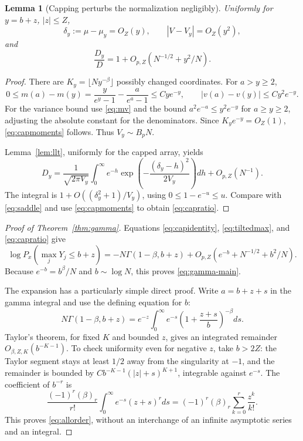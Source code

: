 \documentclass[11pt,a4paper]{article}
\numberwithin{equation}{section}
\newtheorem{lemma}[theorem]{Lemma}
\theoremstyle{definition}
\theoremstyle{remark}
\newcommand{\rise}[2]{(#1)_{#2}}
\begin{document}
\begin{lemma}[Capping perturbs the normalization negligibly]
\label{lem:capping}
Uniformly for $y=b+z$, $|z|\le Z$,
\begin{equation}
 \delta_y:=\mu-\mu_y=O_Z(y),\qquad
 |V-V_y|=O_Z(y^2), \label{eq:capmoments}
\end{equation}
and
\begin{equation}
 \frac{D_y}{D}=1+O_{p,Z}(N^{-1/2}+y^2/N). \label{eq:capratio}
\end{equation}
\end{lemma}
\begin{proof}
There are $K_y=\lfloor Ny^{-\beta}\rfloor$ possibly changed
coordinates. For $a>y\ge2$,
\[
 0\le m(a)-m(y)
 =\frac{y}{e^y-1}-\frac{a}{e^a-1}\le Cye^{-y},
 \qquad |v(a)-v(y)|\le Cy^2e^{-y}.
\]
For the variance bound use \eqref{eq:mv} and the bound
$a^2e^{-a}\le y^2e^{-y}$ for $a\ge y\ge2$, adjusting the absolute
constant for the denominators. Since $K_ye^{-y}=O_Z(1)$,
\eqref{eq:capmoments} follows. Thus $V_y\sim B_pN$.

Lemma~\ref{lem:llt}, uniformly for the capped array, yields
\[
 D_y=\frac1{\sqrt{2\pi V_y}}
 \int_0^\infty e^{-h}
       \exp\!\left(-\frac{(\delta_y-h)^2}{2V_y}\right)dh
       +O_{p,Z}(N^{-1}).
\]
The integral is $1+O((\delta_y^2+1)/V_y)$, using
$0\le1-e^{-u}\le u$. Compare with
\eqref{eq:saddle} and use \eqref{eq:capmoments} to obtain
\eqref{eq:capratio}.
\end{proof}

\begin{proof}[Proof of Theorem~\ref{thm:gamma}]
Equations \eqref{eq:capidentity}, \eqref{eq:tiltedmax}, and
\eqref{eq:capratio} give
\[
 \log P_x(\max_jY_j\le b+z)
 =-N\Gamma(1-\beta,b+z)
   +O_{p,Z}(e^{-b}+N^{-1/2}+b^2/N).
\]
Because $e^{-b}=b^\beta/N$ and $b\sim\log N$, this proves
\eqref{eq:gamma-main}.

The expansion has a particularly simple direct proof. Write
$a=b+z+s$ in the gamma integral and use the defining equation for $b$:
\begin{equation}
 N\Gamma(1-\beta,b+z)
 =e^{-z}\int_0^\infty e^{-s}
       \left(1+\frac{z+s}{b}\right)^{-\beta}ds.
 \label{eq:gamma-shift}
\end{equation}
Taylor's theorem, for fixed $K$ and bounded $z$, gives an integrated
remainder $O_{\beta,Z,K}(b^{-K-1})$. To check uniformity even for
negative $z$, take $b>2Z$: the Taylor segment stays at least $1/2$
away from the singularity at $-1$, and the remainder is bounded by
$C b^{-K-1}(|z|+s)^{K+1}$, integrable against $e^{-s}$.
The coefficient of $b^{-r}$ is
\[
 \frac{(-1)^r\rise\beta r}{r!}
   \int_0^\infty e^{-s}(z+s)^r ds
 =(-1)^r\rise\beta r\sum_{k=0}^r\frac{z^k}{k!}.
\]
This proves \eqref{eq:allorder}, without an interchange of an infinite
asymptotic series and an integral.
\end{proof}
\end{document}
